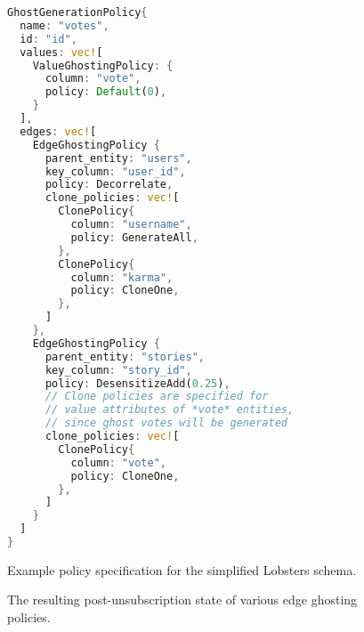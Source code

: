 \begin{figure}
\ContinuedFloat
\begin{lstlisting}[language=rust, numbers=none]
GhostGenerationPolicy{
  name: "votes",
  id: "id",
  values: vec![
    ValueGhostingPolicy: {
      column: "vote", 
      policy: Default(0),
    }
  ],
  edges: vec![
    EdgeGhostingPolicy {
      parent_entity: "users",
      key_column: "user_id",
      policy: Decorrelate,
      clone_policies: vec![
        ClonePolicy{
          column: "username",
          policy: GenerateAll,
        },
        ClonePolicy{
          column: "karma",
          policy: CloneOne,
        },
      ]
    },
    EdgeGhostingPolicy {
      parent_entity: "stories",
      key_column: "story_id",
      policy: DesensitizeAdd(0.25),
      // Clone policies are specified for 
      // value attributes of *vote* entities,
      // since ghost votes will be generated
      clone_policies: vec![
        ClonePolicy{
          column: "vote",
          policy: CloneOne,
        },
      ]
    }
  ]
}
\end{lstlisting}
\caption{Example policy specification for the simplified Lobsters schema.}
\label{fig:example}
\end{figure}

\begin{figure}
\caption{The resulting post-unsubscription state of various edge ghosting policies.}
\label{fig:edge_policies}
\end{figure}
